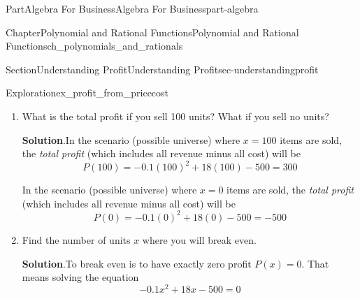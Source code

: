 \documentclass[oneside,10pt,]{tufte-book}
\newcommand{\blocktitlefont}{\relax}
\newcommand{\xreffont}{\relax}
\numberwithin{equation}{chapter}
\newcommand{\amp}{&}
\begin{document}
\begin{partptx}{Part}{Algebra For Business}{}{Algebra For Business}{}{}{part-algebra}
\begin{chapterptx}{Chapter}{Polynomial and Rational Functions}{}{Polynomial and Rational Functions}{}{}{ch_polynomials_and_rationals}
\begin{sectionptx}{Section}{Understanding Profit}{}{Understanding Profit}{}{}{sec-understandingprofit}
\begin{exploration}{Exploration}{}{ex_profit_from_pricecost}
\begin{enumerate}[font=\bfseries,label=(\alph*),ref=\alph*]
\begin{equation*}
R(x) = \Big(x\Big) \cdot \Big(-0.1x + 21\Big) = -0.1x^2 + 21x
\end{equation*}
%
\par
To find the total cost, recall our approach from \hyperref[explore_totalcost1]{Exploration~{\xreffont\ref{explore_totalcost1}}}.  If you are going to sell \(x\) items, you must pay a fixed cost of \(500\) dollars, as well as \(3\)\textdollar{} for each item \(x\).  That gives us a total cost function%
\begin{equation*}
C(x) = 500 + 3x
\end{equation*}
%
\par
We can now combine the total revenue and total cost functions to get the profit function.%
\begin{align*}
\text{Profit} \amp = \text{Revenue} - \text{Cost} \\
P(x) \amp = R(x) - C(x) \\
\amp = ( -0.1x^2 + 21x) - (500 + 3x)  \\
\amp = -0.1x^2 + 21x - 500 - 3x\\
P(x) \amp = -0.1x^2 + 18x - 500
\end{align*}
%
\item{}What is the total profit if you sell 100 units?  What if you sell no units?%
\par\smallskip%
\noindent\textbf{\blocktitlefont Solution}.\hypertarget{ex_profit_from_pricecost-4-2}{}\quad{}In the scenario (possible universe) where \(x=100\) items are sold, the \emph{total profit} (which includes all revenue minus all cost) will be%
\begin{equation*}
P(100) =  -0.1 (100)^2 + 18 (100) - 500 = 300
\end{equation*}
%
\par
In the scenario (possible universe) where \(x=0\) items are sold, the \emph{total profit} (which includes all revenue minus all cost) will be%
\begin{equation*}
P(0) =  -0.1 (0)^2 + 18 (0) - 500 = -500
\end{equation*}
%
\item{}Find the number of units \(x\) where you will break even.%
\par\smallskip%
\noindent\textbf{\blocktitlefont Solution}.\hypertarget{ex_profit_from_pricecost-5-2}{}\quad{}To break even is to have exactly zero profit \(P(x)=0\).  That means solving the equation%
\begin{equation*}
-0.1x^2 + 18x - 500 = 0
\end{equation*}

\end{enumerate}
\end{exploration}
\end{sectionptx}
\end{chapterptx}
\end{partptx}
\end{document}
